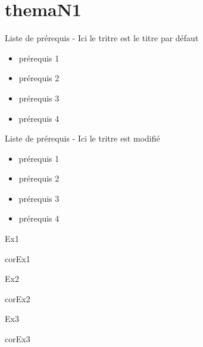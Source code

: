 \documentclass[nocrop]{sesamanuel}
\begin{document}

\themaN
\chapter{themaN1}

\begin{prerequis}
    Liste de prérequis - Ici le tritre est le titre par défaut
    \begin{itemize}
    \item prérequis 1
    \item prérequis 2
    \item prérequis 3
    \item prérequis 4    
    \end{itemize}
\end{prerequis}

\begin{prerequis}
    Liste de prérequis - Ici le tritre est modifié
    \begin{itemize}
    \item prérequis 1
    \item prérequis 2
    \item prérequis 3
    \item prérequis 4    
    \end{itemize}
\end{prerequis}


\begin{autoeval}
    \begin{multicols}{2}
      \begin{exercice}
        Ex1
      \end{exercice}
      \begin{corrige}
        corEx1
      \end{corrige}
      \begin{exercice}
        Ex2
      \end{exercice}
      \begin{corrige}
        corEx2
      \end{corrige}
  \vfill \columnbreak
      \begin{exercice}
        Ex3
      \end{exercice}
      \begin{corrige}
        corEx3
      \end{corrige}
    \end{multicols}
  \end{autoeval}
\end{document}
